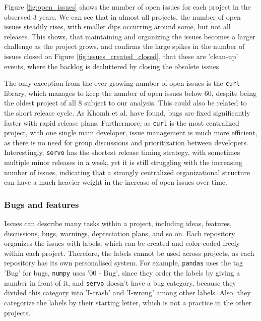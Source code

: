 Figure \ref{fig:open_issues} shows the number of open issues for each project in the observed 3 years. We can see that in almost all projects, the number of open issues steadily rises, with smaller dips occurring around some, but not all releases. This shows, that maintaining and organizing the issues becomes a larger challenge as the project grows, and confirms the large spikes in the number of issues closed on Figure \ref{fig:issues_created_closed}, that these are 'clean-up' events, where the backlog is decluttered by closing the obsolete issues.

The only exception from the ever-growing number of open issues is the \texttt{curl} library, which manages to keep the number of open issues below 60, despite being the oldest project of all 8 subject to our analysis. This could also be related to the short release cycle. As Khomh et al. \cite{khomhFasterReleasesImprove2012} have found, bugs are fixed significantly faster with rapid release plans. Furthermore, as \texttt{curl} is the most centralized project, with one single main developer, issue management is much more efficient, as there is no need for group discussions and prioritization between developers. Interestingly, \texttt{servo} has the shortest release timing strategy, with sometimes multiple minor releases in a week, yet it is still struggling with the increasing number of issues, indicating that a strongly centralized organizational structure can have a much heavier weight in the increase of open issues over time.

\subsubsection{Bugs and features}

Issues can describe many tasks within a project, including ideas, features, discussions, bugs, warnings, depreciation plans, and so on. Each repository organizes the issues with labels, which can be created and color-coded freely within each project. Therefore, the labels cannot be used across projects, as each repository has its own personalised system. For example, \texttt{pandas} uses the tag 'Bug' for bugs, \texttt{numpy} uses '00 - Bug', since they order the labels by giving a number in front of it, and \texttt{servo} doesn't have a bug category, because they divided this category into 'I-crash' and 'I-wrong' among other labels. Also, they categorize the labels by their starting letter, which is not a practice in the other projects.

